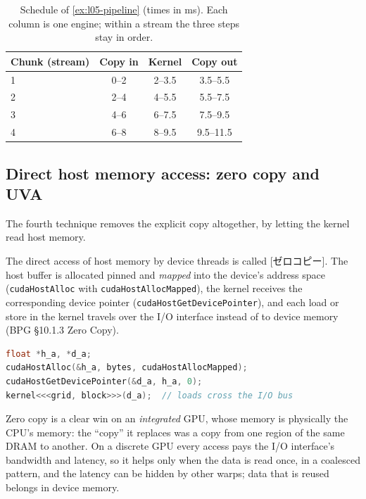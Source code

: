 \documentclass[../main.tex]{subfiles}
\begin{document}
\begin{table}[tb]
  \centering
  \small
  \caption{Schedule of \cref{ex:l05-pipeline} (times in
    \si{\milli\second}).  Each column is one engine; within a stream the
    three steps stay in order.}
  \label{tab:l05-pipeline}
  \begin{tabular}{lccc}
    \toprule
    Chunk (stream) & Copy in & Kernel & Copy out \\
    \midrule
    1 & 0--2 & 2--3.5 & 3.5--5.5 \\
    2 & 2--4 & 4--5.5 & 5.5--7.5 \\
    3 & 4--6 & 6--7.5 & 7.5--9.5 \\
    4 & 6--8 & 8--9.5 & 9.5--11.5 \\
    \bottomrule
  \end{tabular}
\end{table}

\subsection{Direct host memory access: zero copy and UVA}

The fourth technique removes the explicit copy altogether, by letting
the kernel read host memory.

\begin{definition}
  The direct access of host memory by device threads is called
  [ゼロコピー].  The host buffer is allocated pinned and
  \emph{mapped} into the device's address space
  (\texttt{cudaHostAlloc} with \texttt{cudaHostAllocMapped}), the kernel
  receives the corresponding device pointer
  (\texttt{cudaHostGetDevicePointer}), and each load or store in the
  kernel travels over the I/O interface instead of to device
  memory (BPG §10.1.3 Zero Copy).
\end{definition}

\begin{lstlisting}[language=C++, numbers=none]
float *h_a, *d_a;
cudaHostAlloc(&h_a, bytes, cudaHostAllocMapped);
cudaHostGetDevicePointer(&d_a, h_a, 0);
kernel<<<grid, block>>>(d_a);  // loads cross the I/O bus
\end{lstlisting}

Zero copy is a clear win on an \emph{integrated} GPU, whose memory is
physically the CPU's memory: the \enquote{copy} it replaces was a copy
from one region of the same DRAM to another.  On a discrete GPU every
access pays the I/O interface's bandwidth and latency, so it helps only
when the data is read once, in a coalesced pattern, and the latency can
be hidden by other warps; data that is reused belongs in device
memory.
\end{document}
